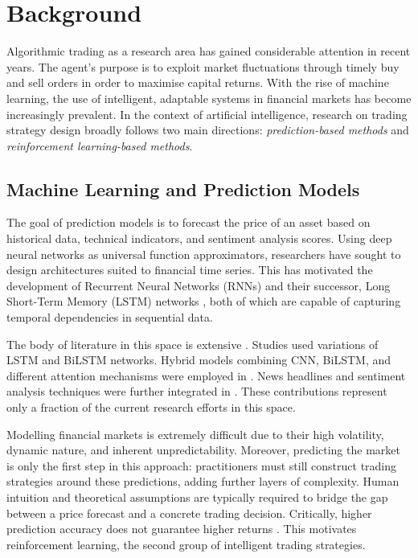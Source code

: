 \documentclass[conference]{IEEEtran}
\begin{document}
\section{Background}
\label{ch:background}

Algorithmic trading as a research area has gained considerable attention in recent years.
The agent's purpose is to exploit market fluctuations through timely buy and sell orders in
order to maximise capital returns. With the rise of machine learning, the use of intelligent,
adaptable systems in financial markets has become increasingly prevalent. In the context of
artificial intelligence, research on trading strategy design broadly follows two main
directions: \emph{prediction-based methods} and \emph{reinforcement learning-based methods}.

\subsection{Machine Learning and Prediction Models}
\label{sec:pred-models}

The goal of prediction models is to forecast the price of an asset
based on historical data, technical indicators, and sentiment analysis scores.
Using deep neural networks as universal function approximators, researchers have sought to
design architectures suited to financial time series. This has motivated the development of
Recurrent Neural Networks (RNNs) \cite{rumelhart1986rnn} and their successor, Long Short-Term
Memory (LSTM) networks \cite{hochreiter1997lstm}, both of which are capable of capturing temporal
dependencies in sequential data.

The body of literature in this space is extensive \cite{huang2024novel}.
Studies \cite{zhang2021forecasting,qiao2022prediction,md2022novel}
used variations of LSTM and BiLSTM networks.
Hybrid models combining CNN, BiLSTM, and different attention mechanisms were employed in
\cite{lu2020cnn,huang2021financial,shi2023integrated}.
News headlines and sentiment analysis techniques were further integrated in
\cite{sridhar2021news}. These contributions represent only a fraction of the current research
efforts in this space.

Modelling financial markets is extremely difficult due to their high volatility, dynamic
nature, and inherent unpredictability. Moreover, predicting the market is only the first step
in this approach: practitioners must still construct trading strategies around these
predictions, adding further layers of complexity. Human intuition and theoretical assumptions
are typically required to bridge the gap between a price forecast and a concrete trading
decision. Critically, higher prediction accuracy does not guarantee higher returns
\cite{huang2024novel}. This motivates reinforcement learning, the second group of intelligent trading strategies.
\end{document}
